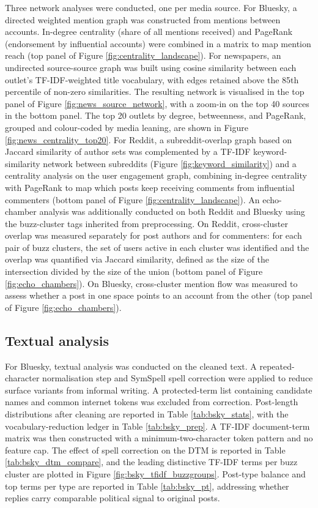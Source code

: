 Three network analyses were conducted, one per media source. For Bluesky, a directed weighted mention graph was constructed from mentions between accounts. In-degree centrality (share of all mentions received) and PageRank (endorsement by influential accounts) were combined in a matrix to map mention reach (top panel of Figure \ref{fig:centrality_landscape}). For newspapers, an undirected source-source graph was built using cosine similarity between each outlet's TF-IDF-weighted title vocabulary, with edges retained above the 85th percentile of non-zero similarities. The resulting network is visualised in the top panel of Figure \ref{fig:news_source_network}, with a zoom-in on the top 40 sources in the bottom panel. The top 20 outlets by degree, betweenness, and PageRank, grouped and colour-coded by media leaning, are shown in Figure \ref{fig:news_centrality_top20}. For Reddit, a subreddit-overlap graph based on Jaccard similarity of author sets was complemented by a TF-IDF keyword-similarity network between subreddits (Figure \ref{fig:keyword_similarity}) and a centrality analysis on the user engagement graph, combining in-degree centrality with PageRank to map which posts keep receiving comments from influential commenters (bottom panel of Figure \ref{fig:centrality_landscape}). An echo-chamber analysis was additionally conducted on both Reddit and Bluesky using the buzz-cluster tags inherited from preprocessing. On Reddit, cross-cluster overlap was measured separately for post authors and for commenters: for each pair of buzz clusters, the set of users active in each cluster was identified and the overlap was quantified via Jaccard similarity, defined as the size of the intersection divided by the size of the union (bottom panel of Figure \ref{fig:echo_chambers}). On Bluesky, cross-cluster mention flow was measured to assess whether a post in one space points to an account from the other (top panel of Figure \ref{fig:echo_chambers}).

\subsection{Textual analysis}

For Bluesky, textual analysis was conducted on the cleaned text. A repeated-character normalisation step and SymSpell spell correction were applied to reduce surface variants from informal writing. A protected-term list containing candidate names and common internet tokens was excluded from correction. Post-length distributions after cleaning are reported in Table \ref{tab:bsky_stats}, with the vocabulary-reduction ledger in Table \ref{tab:bsky_prep}. A TF-IDF document-term matrix was then constructed with a minimum-two-character token pattern and no feature cap. The effect of spell correction on the DTM is reported in Table \ref{tab:bsky_dtm_compare}, and the leading distinctive TF-IDF terms per buzz cluster are plotted in Figure \ref{fig:bsky_tfidf_buzzgroups}. Post-type balance and top terms per type are reported in Table \ref{tab:bsky_pt}, addressing whether replies carry comparable political signal to original posts.

